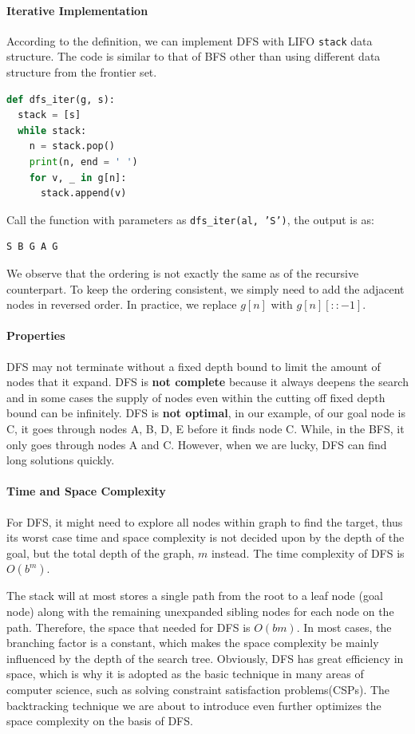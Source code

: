 \documentclass[main.tex]{subfiles}
\begin{document}
\paragraph{Iterative Implementation} According to the definition, we can implement DFS with LIFO \texttt{stack} data structure. The code is similar to that of BFS other than using different data structure from the frontier set.
\begin{lstlisting}[language=Python]
def dfs_iter(g, s):
  stack = [s]
  while stack:
    n = stack.pop()
    print(n, end = ' ')
    for v, _ in g[n]:
      stack.append(v)
\end{lstlisting}
Call the function with parameters as \texttt{dfs\_iter(al, 'S')}, the output is as:
\begin{lstlisting}[numbers=none]
S B G A G 
\end{lstlisting}
We observe that the ordering is not exactly the same as of the recursive counterpart. To keep the ordering consistent, we simply need to add the adjacent nodes in reversed order. In practice, we replace \texttt{$g[n]$} with \texttt{$g[n][::-1]$}.

\paragraph{Properties} DFS may not terminate without a fixed depth bound to limit the amount of nodes that it expand. DFS is \textbf{not complete} because it always deepens the search and in some cases the supply of nodes even within the cutting off fixed depth bound can be infinitely. DFS is \textbf{not optimal}, in our example, of our goal node is C, it goes through nodes A, B, D, E before it finds node C. While, in the BFS, it only goes through nodes A and C. However, when we are lucky, DFS can find long solutions quickly.

\paragraph{Time and Space Complexity} 
For DFS, it might need to explore all nodes within  graph to find the target, thus its worst case time and space complexity is not decided upon by the depth of the goal, but the total depth of the graph, $m$ instead. The time complexity of DFS is $O(b^m)$.

The stack will at most stores  a single path from the root to a leaf node (goal node) along with the  remaining unexpanded sibling nodes for each node on the path. Therefore, the space that needed for DFS is $O(bm)$. In most cases, the branching factor is a constant, which makes the space complexity be mainly influenced by the depth of the search tree. Obviously, DFS has great efficiency in space, which is why it is adopted as the basic technique in many areas of computer science, such as solving constraint satisfaction problems(CSPs). The backtracking technique we are about to introduce even further  optimizes the space complexity on the basis of DFS.
\end{document}
